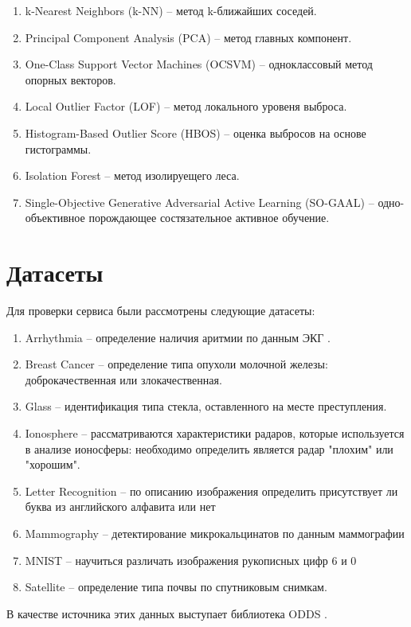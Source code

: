 \begin{enumerate}
	\item k-Nearest Neighbors (k-NN) \cite{knn} -- метод k-ближайших соседей.
	\item Principal Component Analysis (PCA) \cite{pca} -- метод главных компонент.
	\item One-Class Support Vector Machines (OCSVM) \cite{ocsvm} -- одноклассовый метод опорных векторов.
	\item Local Outlier Factor (LOF) \cite{lof} -- метод локального уровеня выброса.
	\item Histogram-Based Outlier Score (HBOS) \cite{hbos} -- оценка выбросов на основе гистограммы.
	\item Isolation Forest \cite{iforest} -- метод изолируещего леса.
	\item Single-Objective Generative Adversarial Active Learning (SO-GAAL) \cite{gaal} -- одно-объективное порождающее состязательное активное обучение.
\end{enumerate}

\section{Датасеты} \label{sec:ch2/sec5}

\noindent Для проверки сервиса были рассмотрены следующие датасеты:
\begin{enumerate}
  \item Arrhythmia -- определение наличия аритмии по данным ЭКГ \cite{guvenir}.
  \item Breast Cancer -- определение типа опухоли молочной железы: доброкачественная или злокачественная.
  \item Glass -- идентификация типа стекла, оставленного на месте преступления.
  \item Ionosphere -- рассматриваются характеристики радаров, которые используется в анализе ионосферы: необходимо определить является радар "плохим" или "хорошим".
  \item Letter Recognition -- по описанию изображения определить присутствует ли буква из английского алфавита или нет
  \item Mammography -- детектирование микрокальцинатов по данным маммографии
  \item MNIST -- научиться различать изображения рукописных цифр 6 и 0
  \item Satellite -- определение типа почвы по спутниковым снимкам.
\end{enumerate}
В качестве источника этих данных выступает библиотека ODDS \cite{odds}.

